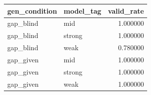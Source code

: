 \begin{tabular}{llr}
\toprule
gen_condition & model_tag & valid_rate \\
\midrule
gap_blind & mid & 1.000000 \\
gap_blind & strong & 1.000000 \\
gap_blind & weak & 0.780000 \\
gap_given & mid & 1.000000 \\
gap_given & strong & 1.000000 \\
gap_given & weak & 1.000000 \\
\bottomrule
\end{tabular}
